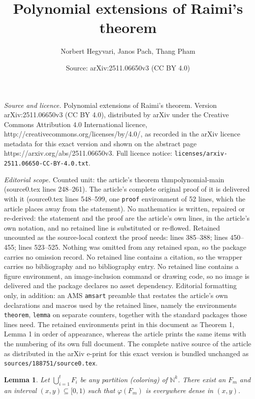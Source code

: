 \documentclass[10pt,a4paper]{amsart}
\title{Polynomial extensions of Raimi's theorem}
\author{Norbert Hegyvari, Janos Pach, Thang Pham}
\date{Source: arXiv:2511.06650v3 (CC BY 4.0)}
\newtheorem{lemma}{Lemma}
\def\N{{\mathbb  N}}
\begin{document}
\maketitle

\noindent\emph{Source and licence.} Polynomial extensions of Raimi's theorem. Version arXiv:2511.06650v3 (CC BY 4.0), distributed by arXiv under the Creative Commons Attribution 4.0 International licence, http://creativecommons.org/licenses/by/4.0/, as recorded in the arXiv licence metadata for this exact version and shown on the abstract page https://arxiv.org/abs/2511.06650v3. Full licence notice: \texttt{licenses/arxiv-2511.06650-CC-BY-4.0.txt}.\par\smallskip

\noindent\textit{Editorial scope.} Counted unit: the article's theorem thmpolynomial-main (source0.tex lines 248--261). The article's complete original proof of it is delivered with it (source0.tex lines 548--599, one \texttt{proof} environment of 52 lines, which the article places away from the statement). No mathematics is written, repaired or re-derived: the statement and the proof are the article's own lines, in the article's own notation, and no retained line is substituted or re-flowed.  Retained uncounted as the source-local context the proof needs: lines 385--388; lines 450--455; lines 523--525.  Nothing was omitted from any retained span, so the package carries no omission record.  No retained line contains a citation, so the wrapper carries no bibliography and no bibliography entry.  No retained line contains a figure environment, an image-inclusion command or drawing code, so no image is delivered and the package declares no asset dependency.  Editorial formatting only, in addition: an AMS \texttt{amsart} preamble that restates the article's own declarations and macros used by the retained lines, namely the environments \texttt{theorem}, \texttt{lemma} on separate counters, together with the standard packages those lines need.  The retained environments print in this document as Theorem 1, Lemma 1 in order of appearance, whereas the article prints the same items with the numbering of its own full document.  The complete native source of the article as distributed in the arXiv e-print for this exact version is bundled unchanged as \texttt{sources/188751/source0.tex}.
\begin{lemma}\label{lm2.1}
Let $\bigcup_{i=1}^tF_i$ be any partition (coloring) of $\N^k$. There exist an $F_m$ and an interval $(x,y)\subseteq [0,1)$ such that  $\varphi(F_m)$ is everywhere dense in $(x, y)$. 
  
\end{lemma}
\end{document}
